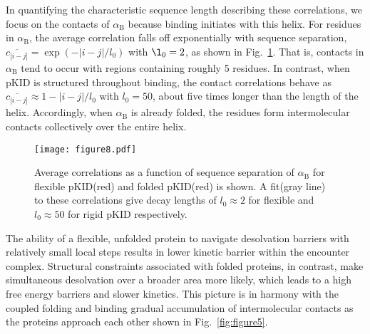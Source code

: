 \documentclass[../talant.diss.submit.tex]{subfiles}
\begin{document}
In quantifying the characteristic sequence length describing these correlations,
we focus on the contacts of $\alpha_\mathrm{B}$ because binding initiates with
this helix.  For residues in $\alpha_\mathrm{B}$, the average correlation falls
off exponentially with sequence separation,
$\overline{c_{|i-j|}} = \exp(-|i-j|/l_0)$ with $\l_0 = 2$, as shown in
Fig.~\ref{fig:figure8}. That is, contacts in $\alpha_\mathrm{B}$ tend to occur
with regions containing roughly 5 residues. In contrast, when pKID is structured
throughout binding, the contact correlations behave as
$\overline{c_{|i-j|}} \approx 1 - |i-j|/l_0$ with $l_0 = 50$, about five times
longer than the length of the helix. Accordingly, when $\alpha_{\mathrm{B}}$ is
already folded, the residues form intermolecular contacts collectively over the
entire helix.

\begin{figure}[ht!]
  \centering
  \texttt{[image: figure8.pdf]}
  \caption{Average correlations as a function of sequence separation of
    $\alpha_{\mathrm{B}}$ for flexible pKID(red) and folded pKID(red) is
    shown. A fit(gray line) to these correlations give decay lengths of
    $l_0 \approx 2$ for flexible and $l_0 \approx 50$ for rigid pKID
    respectively.}
  \label{fig:figure8}
\end{figure}


The ability of a flexible, unfolded protein to navigate desolvation barriers
with relatively small local steps results in lower kinetic barrier within the
encounter complex. Structural constraints associated with folded proteins, in
contrast, make simultaneous desolvation over a broader area more likely, which
leads to a high free energy barriers and slower kinetics. This picture is in
harmony with the coupled folding and binding gradual accumulation of
intermolecular contacts as the proteins approach each other shown in
Fig.~\ref{fig:figure5}.


%
\end{document}
